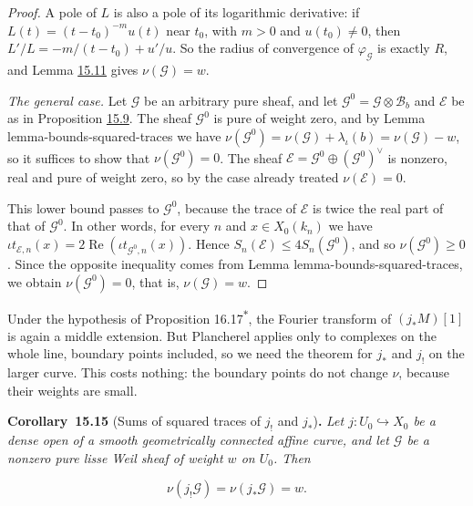 \documentclass[11pt]{article}
\newenvironment{bpstatement}[2]{\par\addvspace{0.6\baselineskip}\noindent\textbf{#1}#2\textbf{.}\enspace\ignorespaces}
  {\par\addvspace{0.4\baselineskip}}
\newenvironment{bpstatementit}[2]{\begin{bpstatement}{#1}{#2}\itshape\ignorespaces}{\end{bpstatement}}
\newcommand{\bpout}[1]{#1\textsuperscript{\hyperlink{bp-outside}{\ensuremath{\ast}}}}
\begin{document}
\begin{proof}[{Proof}]
A pole of \(L\) is also a pole of its logarithmic derivative: if \(L(t)=(t-t_0)^{-m}u(t)\) near \(t_0\), with \(m>0\) and \(u(t_0)\ne0\), then \(L'/L=-m/(t-t_0)+u'/u\). So the radius of convergence of \(\varphi_{\mathcal G}\) is exactly \(R\), and Lemma \hyperref[bp32]{15.11} gives \(\nu(\mathcal G)=w\).

\emph{The general case.} Let \(\mathcal G\) be an arbitrary pure sheaf, and let \(\mathcal G^0=\mathcal G\otimes\mathcal B_b\) and \(\mathcal E\) be as in Proposition \hyperref[bp27]{15.9}. The sheaf \(\mathcal G^0\) is pure of weight zero, and by Lemma lemma-bounds-squared-traces we have \(\nu(\mathcal G^0)=\nu(\mathcal G)+\lambda_\iota(b)=\nu(\mathcal G)-w\), so it suffices to show that \(\nu(\mathcal G^0)=0\). The sheaf \(\mathcal E=\mathcal G^0\oplus(\mathcal G^0)^\vee\) is nonzero, real and pure of weight zero, so by the case already treated \(\nu(\mathcal E)=0\).

This lower bound passes to \(\mathcal G^0\), because the trace of \(\mathcal E\) is twice the real part of that of \(\mathcal G^0\). In other words, for every \(n\) and \(x\in X_0(k_n)\) we have \(\iota t_{\mathcal E,n}(x)=2\operatorname{Re}(\iota t_{\mathcal G^0,n}(x))\). Hence \(S_n(\mathcal E)\le4S_n(\mathcal G^0)\), and so \(\nu(\mathcal G^0)\ge0\). Since the opposite inequality comes from Lemma lemma-bounds-squared-traces, we obtain \(\nu(\mathcal G^0)=0\), that is, \(\nu(\mathcal G)=w\).
\end{proof}

\label{bp43}%
Under the hypothesis of Proposition \bpout{16.17}, the Fourier transform of \((j_*M)[1]\) is again a middle extension. But Plancherel applies only to complexes on the whole line, boundary points included, so we need the theorem for \(j_*\) and \(j_!\) on the larger curve. This costs nothing: the boundary points do not change \(\nu\), because their weights are small.

\label{bp44}%
\begin{bpstatementit}{Corollary~15.15}{ (Sums of squared traces of $j_!$ and $j_*$)}
Let \(j:U_0\hookrightarrow X_0\) be a dense open of a smooth geometrically connected affine curve, and let \(\mathcal G\) be a nonzero pure lisse Weil sheaf of weight \(w\) on \(U_0\). Then

\[
\nu(j_!\mathcal G)=\nu(j_*\mathcal G)=w.
\]
\end{bpstatementit}
\end{document}
